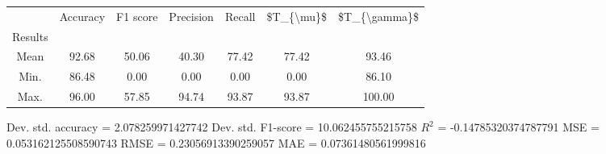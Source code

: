\begin{tabular}{|c|c|c|c|c|c|c|}
\toprule
{} &  Accuracy &  F1 score &  Precision &  Recall &  \$T\_\{\textbackslash mu\}\$ &  \$T\_\{\textbackslash gamma\}\$ \\
Results &           &           &            &         &            &               \\
\hline
Mean    &     92.68 &     50.06 &      40.30 &   77.42 &      77.42 &         93.46 \\
Min.    &     86.48 &      0.00 &       0.00 &    0.00 &       0.00 &         86.10 \\
Max.    &     96.00 &     57.85 &      94.74 &   93.87 &      93.87 &        100.00 \\
\bottomrule
\end{tabular}

 Dev. std. accuracy = 2.078259971427742
 Dev. std. F1-score = 10.062455755215758
 $R^2$ = -0.14785320374787791
 MSE = 0.053162125508590743
 RMSE = 0.23056913390259057
 MAE = 0.07361480561999816